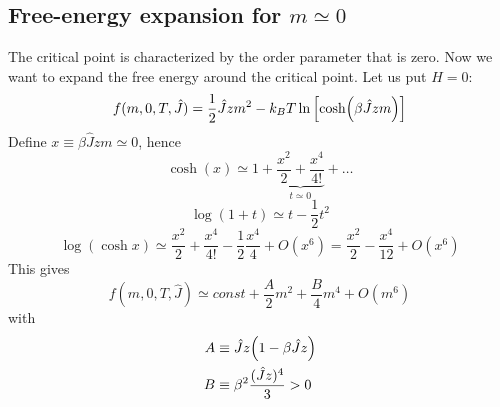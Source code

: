 \documentclass[../main/main.tex]{subfiles}
\begin{document}
\subsection{Free-energy expansion for \( m \simeq 0 \)}
The critical point is characterized by the order parameter that is zero. Now we want to expand the free energy around the critical point. Let us put \( H=0 \):
\begin{equation}
  f(m,0,T,\hat{J} ) = \frac{1}{2}\hat{J}zm^2 -k_BT \ln{\qty[\cosh(\beta \hat{J}zm )]}
\end{equation}
Define \( x \equiv \beta \hat{J} z m \simeq 0  \), hence
\begin{equation}
  \cosh (x) \simeq 1 + \underbrace{\frac{x^2}{2} + \frac{x^4}{4!}}_{t \simeq 0}  + \dots
\end{equation}
\begin{equation}
  \log{(1+t)} \simeq t - \frac{1}{2}t^2
\end{equation}
\begin{equation}
  \log{(\cosh x)} \simeq \frac{x^2}{2} + \frac{x^4}{4!} - \frac{1}{2} \frac{x^4}{4}+O(x^6)
  = \frac{x^2}{2} - \frac{x^4}{12}+O(x^6)
\end{equation}
This gives
\begin{equation}
  f(m,0,T,\hat{J} ) \simeq  const + \frac{A}{2} m^2 + \frac{B}{4} m^4 + O (m^6)
\end{equation}
with
\begin{subequations}
\begin{align}
   A & \equiv  \hat{J} z \qty(1- \beta \hat{J} z) \\
    B & \equiv  \beta ^2 \frac{(\hat{J}z )^4}{3} > 0
\end{align}
\end{subequations}
\end{document}
